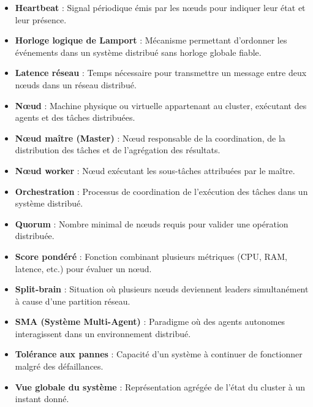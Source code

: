 \documentclass[12pt,a4paper]{report}
\begin{document}
\begin{itemize}
\item[*] \textbf{Heartbeat} : Signal périodique émis par les nœuds pour indiquer leur état et leur présence.

\item[*] \textbf{Horloge logique de Lamport} : Mécanisme permettant d'ordonner les événements dans un système distribué sans horloge globale fiable.

\item[*] \textbf{Latence réseau} : Temps nécessaire pour transmettre un message entre deux nœuds dans un réseau distribué.

\item[*] \textbf{Nœud} : Machine physique ou virtuelle appartenant au cluster, exécutant des agents et des tâches distribuées.

\item[*] \textbf{Nœud maître (Master)} : Nœud responsable de la coordination, de la distribution des tâches et de l'agrégation des résultats.

\item[*] \textbf{Nœud worker} : Nœud exécutant les sous-tâches attribuées par le maître.

\item[*] \textbf{Orchestration} : Processus de coordination de l'exécution des tâches dans un système distribué.

\item[*] \textbf{Quorum} : Nombre minimal de nœuds requis pour valider une opération distribuée.

\item[*] \textbf{Score pondéré} : Fonction combinant plusieurs métriques (CPU, RAM, latence, etc.) pour évaluer un nœud.

\item[*] \textbf{Split-brain} : Situation où plusieurs nœuds deviennent leaders simultanément à cause d'une partition réseau.

\item[*] \textbf{SMA (Système Multi-Agent)} : Paradigme où des agents autonomes interagissent dans un environnement distribué.

\item[*] \textbf{Tolérance aux pannes} : Capacité d'un système à continuer de fonctionner malgré des défaillances.

\item[*] \textbf{Vue globale du système} : Représentation agrégée de l'état du cluster à un instant donné.

\end{itemize}
\end{document}
